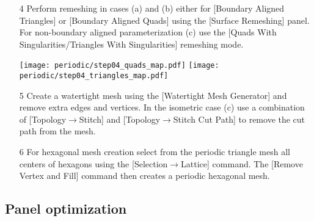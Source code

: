 \documentclass[Thesis.tex]{subfiles}
\begin{document}
\begin{itemize}
\item[4] Perform remeshing in cases (a) and (b) either for [Boundary Aligned Triangles] or [Boundary Aligned Quads] using the [Surface Remeshing] panel. For non-boundary aligned parameterization (c) use the [Quads With Singularities/Triangles With Singularities] remeshing mode.\\

\begin{center}
\begin{minipage}{0.9\linewidth}
            \centering
            \texttt{[image: periodic/step04\_quads\_map.pdf]}
            \texttt{[image: periodic/step04\_triangles\_map.pdf]}
\end{minipage}
\end{center}    

\item[5] Create a watertight mesh using the [Watertight Mesh Generator] and remove extra edges and vertices. In the isometric case (c) use a combination of [Topology$\to$Stitch] and [Topology$\to$Stitch Cut Path] to remove the cut path from the mesh.
\item[6] For hexagonal mesh creation select from the periodic triangle mesh all centers of hexagons using the [Selection$\to$Lattice] command. The [Remove Vertex and Fill] command then creates a periodic hexagonal mesh.
\begin{center}
\begin{minipage}{0.9\linewidth}
            \centering
\end{minipage}
\end{center}                
\end{itemize}

\subsection{Panel optimization}
\end{document}
